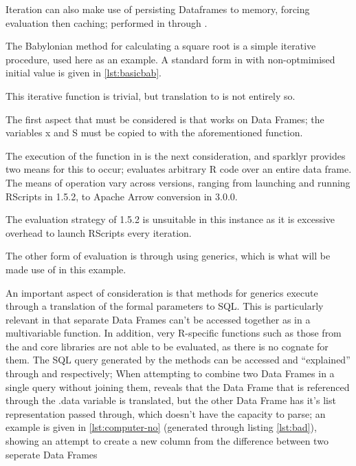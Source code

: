 Iteration can also make use of persisting  Dataframes to memory,
forcing evaluation then caching; performed in  through
.

The Babylonian method for calculating a square root is a simple
iterative procedure, used here as an example. A standard form in \R{} with
non-optmimised initial value is given in \cref{lst:basicbab}.



This iterative function is trivial, but translation to  is not
entirely so.

The first aspect that must be considered is that  works on 
Data Frames; the variables x and S must be copied to  with the
aforementioned 
function.

The execution of the function in  is the next consideration, and
sparklyr provides two means for this to occur;
 evaluates arbitrary R
code over an entire data frame. The means of operation vary across 
versions, ranging from launching and running RScripts in  1.5.2, to
Apache Arrow conversion in  3.0.0.

The evaluation strategy of 1.5.2 is unsuitable in this instance as it is
excessive overhead to launch RScripts every iteration.

The other form of evaluation is through using  generics, which is
what will be made use of in this example.

An important aspect of consideration is that  methods for 
generics execute through a translation of the formal parameters to 
SQL. This is particularly relevant in that separate  Data Frames
can't be accessed together as in a multivariable function. In addition,
very R-specific functions such as those from the  and
 core libraries are not able to be evaluated, as there is
no  cognate for them. The SQL query generated by the methods
can be accessed and ``explained'' through
 and
 respectively; When attempting
to combine two  Data Frames in a single query without joining them,
 reveals that the Data
Frame that is referenced through the .data variable is
translated, but the other Data Frame has it's list representation passed
through, which  doesn't have the capacity to parse; an example
is given in \cref{lst:computer-no} (generated through listing
\cref{lst:bad}), showing an attempt to create a new column from the
difference between two seperate Data Frames

